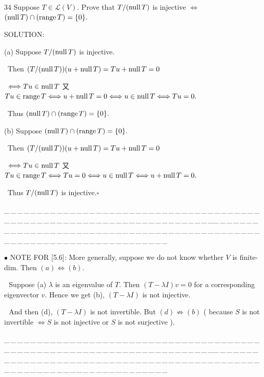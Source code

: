 \documentclass[a4paper, 11pt, UTF8]{article}
\def\range{\textup{range}\,}
\def\null{\textup{null\,}}
\def\Lm{\mathcal{L}}
\begin{document}
\begin{large}
{\timesbf\Large 34} {\timessl\Large 
Suppose $T\in\Lm(V).$ Prove that $T/(\null T)$ is injective $\Longleftrightarrow$ $(\null T)\cap(\range T)=\{0\}.$
}\par
{\timesbf S\footnotesize{OLUTION:}}\par\quad
(a) Suppose $T/(\null T)$ is injective.\par\qquad\,
Then $(T/(\null T))(u+\null T)=Tu+\null T=0$\par\qquad\,
$\Longleftrightarrow Tu\in\null T$ 又 $Tu\in\range T\Longleftrightarrow u+\null T=0\Longleftrightarrow u\in\null T\Longleftrightarrow Tu=0.$\par\qquad\,
Thus $(\null T)\cap(\range T)=\{0\}.$\par\quad
(b) Suppose $(\null T)\cap(\range T)=\{0\}.$\par\qquad\,
Then $(T/(\null T))(u+\null T)=Tu+\null T=0$\par\qquad\,
$\Longleftrightarrow Tu\in\null T$ 又 $Tu\in\range T\Longleftrightarrow Tu=0\Longleftrightarrow u\in\null T\Longleftrightarrow u+\null T=0.$\par\qquad\,
Thus $T/(\null T)$ is injective.\quad$\square$\par
{\tiny \_\,\_\,\_\,\_\,\_\,\_\,\_\,\_\,\_\,\_\,\_\,\_\,\_\,\_\,\_\,\_\,\_\,\_\,\_\,\_\,\_\,\_\,\_\,\_\,\_\,\_\,\_\,\_\,\_\,\_\,\_\,\_\,\_\,\_\,\_\,\_\,\_\,\_\,\_\,\_\,\_\,\_\,\_\,\_\,\_\,\_\,\_\,\_\,\_\,\_\,\_\,\_\,\_\,\_\,\_\,\_\,\_\,\_\,\_\,\_\,\_\,\_\,\_\,\_\,\_\,\_\,\_\,\_\,\_\,\_\,\_\_\,\_\,\_\,\_\,\_\,\_\,\_\,\_\,\_\,\_\,\_\,\_\,\_\,\_\,\_\,\_\,\_\,\_\,\_\,\_\,\_\,\_\,\_\,\_\,\_\,\_\,\_\,\_\,\_\,\_\,\_\,\_\,\_\,\_\,\_\,\_\,\_\,\_\,\_\,\_\,\_\,\_\,\_\,\_\,\_\,\_\,\_\,\_\,\_\,\_\,\_\,\_\,\_\,\_\,\_\,\_\,\_\,\_\,\_\,\_\,\_\,\_\,\_\,\_\,\_\,\_\,\_\,\_\,\_\,\_\,\_}\par


{\small $\bullet$} {\timesbf\Large N{\normalsize OTE} F{\normalsize OR} [5.6]:} More generally, suppose we do not know whether $V$ is finite-dim. Then $(a)\Longleftrightarrow(b).$\small\par\,\,
Suppose (a) $\lambda$ is an eigenvalue of $T.$ 
Then $(T-\lambda I)v=0$ for a corresponding eigenvector $v.$ Hence we get (b), $(T-\lambda I)$ is not injective.\par\,\,
And then (d), $(T-\lambda I)$ is not invertible. But $(d)\not\Rightarrow(b)$ ( because $S$ is not invertible $\Longleftrightarrow S$ is not injective {\timessl or} $S$ is not surjective ).\par
{\tiny \_\,\_\,\_\,\_\,\_\,\_\,\_\,\_\,\_\,\_\,\_\,\_\,\_\,\_\,\_\,\_\,\_\,\_\,\_\,\_\,\_\,\_\,\_\,\_\,\_\,\_\,\_\,\_\,\_\,\_\,\_\,\_\,\_\,\_\,\_\,\_\,\_\,\_\,\_\,\_\,\_\,\_\,\_\,\_\,\_\,\_\,\_\,\_\,\_\,\_\,\_\,\_\,\_\,\_\,\_\,\_\,\_\,\_\,\_\,\_\,\_\,\_\,\_\,\_\,\_\,\_\,\_\,\_\,\_\,\_\,\_\_\,\_\,\_\,\_\,\_\,\_\,\_\,\_\,\_\,\_\,\_\,\_\,\_\,\_\,\_\,\_\,\_\,\_\,\_\,\_\,\_\,\_\,\_\,\_\,\_\,\_\,\_\,\_\,\_\,\_\,\_\,\_\,\_\,\_\,\_\,\_\,\_\,\_\,\_\,\_\,\_\,\_\,\_\,\_\,\_\,\_\,\_\,\_\,\_\,\_\,\_\,\_\,\_\,\_\,\_\,\_\,\_\,\_\,\_\,\_\,\_\,\_\,\_\,\_\,\_\,\_\,\_\,\_\,\_\,\_\,\_}\par\large



\end{large}
\end{document}
